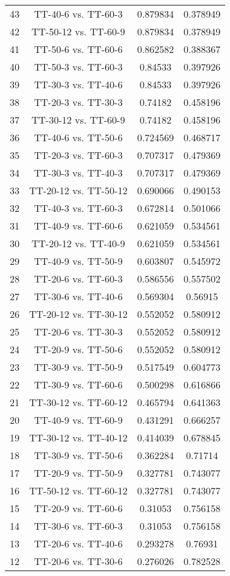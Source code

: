 \documentclass[a4paper,10pt]{article}
\begin{document}
\begin{landscape}
\begin{table}[!htp]
\begin{tabular}{cccc}
43&TT-40-6 vs. TT-60-3&0.879834&0.378949\\
42&TT-50-12 vs. TT-60-9&0.879834&0.378949\\
41&TT-50-6 vs. TT-60-6&0.862582&0.388367\\
40&TT-50-3 vs. TT-60-3&0.84533&0.397926\\
39&TT-30-3 vs. TT-40-6&0.84533&0.397926\\
38&TT-20-3 vs. TT-30-3&0.74182&0.458196\\
37&TT-30-12 vs. TT-60-9&0.74182&0.458196\\
36&TT-40-6 vs. TT-50-6&0.724569&0.468717\\
35&TT-20-3 vs. TT-60-3&0.707317&0.479369\\
34&TT-30-3 vs. TT-40-3&0.707317&0.479369\\
33&TT-20-12 vs. TT-50-12&0.690066&0.490153\\
32&TT-40-3 vs. TT-60-3&0.672814&0.501066\\
31&TT-40-9 vs. TT-60-6&0.621059&0.534561\\
30&TT-20-12 vs. TT-40-9&0.621059&0.534561\\
29&TT-40-9 vs. TT-50-9&0.603807&0.545972\\
28&TT-20-6 vs. TT-60-3&0.586556&0.557502\\
27&TT-30-6 vs. TT-40-6&0.569304&0.56915\\
26&TT-20-12 vs. TT-30-12&0.552052&0.580912\\
25&TT-20-6 vs. TT-30-3&0.552052&0.580912\\
24&TT-20-9 vs. TT-50-6&0.552052&0.580912\\
23&TT-30-9 vs. TT-50-9&0.517549&0.604773\\
22&TT-30-9 vs. TT-60-6&0.500298&0.616866\\
21&TT-30-12 vs. TT-60-12&0.465794&0.641363\\
20&TT-40-9 vs. TT-60-9&0.431291&0.666257\\
19&TT-30-12 vs. TT-40-12&0.414039&0.678845\\
18&TT-30-9 vs. TT-50-6&0.362284&0.71714\\
17&TT-20-9 vs. TT-50-9&0.327781&0.743077\\
16&TT-50-12 vs. TT-60-12&0.327781&0.743077\\
15&TT-20-9 vs. TT-60-6&0.31053&0.756158\\
14&TT-30-6 vs. TT-60-3&0.31053&0.756158\\
13&TT-20-6 vs. TT-40-6&0.293278&0.76931\\
12&TT-20-6 vs. TT-30-6&0.276026&0.782528\\

\end{tabular}
\end{table}
\end{landscape}
\end{document}
